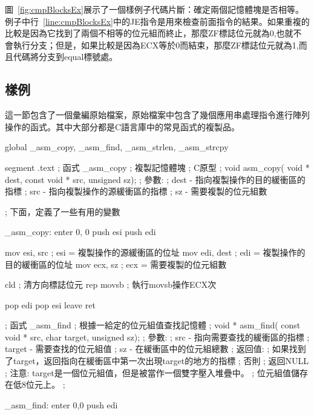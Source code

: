 圖~\ref{fig:cmpBlocksEx}展示了一個樣例子代碼片斷：確定兩個記憶體塊是否相等。例子中行~\ref{line:cmpBlocksEx}中的{\code JE}指令是用來檢查前面指令的結果。如果重複的比較是因為它找到了兩個不相等的位元組而終止，那麼ZF標誌位元就為0,也就不會執行分支；但是，如果比較是因為ECX等於0而結束，那麼ZF標誌位元就為1,而且代碼將分支到{\code equal}標號處。

\subsection{樣例}

這一節包含了一個彙編原始檔案，原始檔案中包含了幾個應用串處理指令進行陣列操作的函式。其中大部分都是C語言庫中的常見函式的複製品。

\begin{AsmCodeListing}[label=memory.asm]
global _asm_copy, _asm_find, _asm_strlen, _asm_strcpy

segment .text
; 函式 _asm_copy
; 複製記憶體塊
; C原型
; void asm_copy( void * dest, const void * src, unsigned sz);
; 參數:
;   dest - 指向複製操作的目的緩衝區的指標
;   src  - 指向複製操作的源緩衝區的指標
;   sz   - 需要複製的位元組數

; 下面，定義了一些有用的變數

_asm_copy:
        enter   0, 0
        push    esi
        push    edi

        mov     esi, src        ; esi = 複製操作的源緩衝區的位址
        mov     edi, dest       ; edi = 複製操作的目的緩衝區的位址
        mov     ecx, sz         ; ecx = 需要複製的位元組數

        cld                     ; 清方向標誌位元
        rep     movsb           ; 執行movsb操作ECX次

        pop     edi
        pop     esi
        leave
        ret


; 函式 _asm_find
; 根據一給定的位元組值查找記憶體
; void * asm_find( const void * src, char target, unsigned sz);
; 參數:
;   src    - 指向需要查找的緩衝區的指標
;   target - 需要查找的位元組值
;   sz     - 在緩衝區中的位元組總數
; 返回值:
;   如果找到了target，返回指向在緩衝區中第一次出現target的地方的指標
;   否則
;     返回NULL
; 注意: target是一個位元組值，但是被當作一個雙字壓入堆疊中。
;       位元組值儲存在低8位元上。
;

_asm_find:
        enter   0,0
        push    edi


\end{AsmCodeListing}
